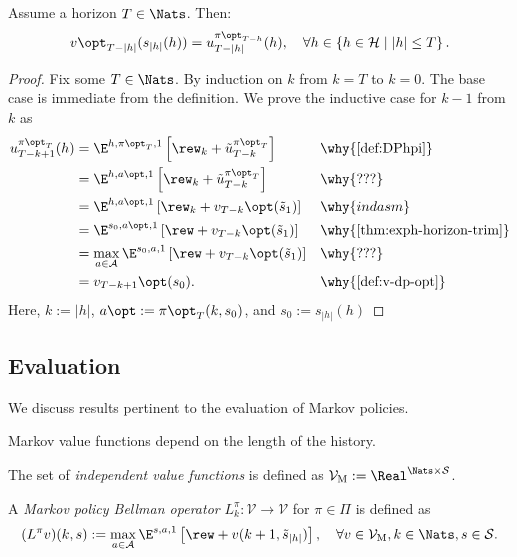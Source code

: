 \begin{theorem}
Assume a horizon $T\in \Nats$. Then:
\[
  v\opt_{T-|h|}(s_{|h|}(h)) = u^{\pi\opt_{T-h}}_{T-|h|}(h), \quad
  \forall h\in \left\{ h\in \mathcal{H} \mid |h| \le T \right\}.
\]
\end{theorem}
\begin{proof}
Fix some $T \in \Nats$. By induction on $k$ from $k = T$ to $k=0$. The base case is immediate from the definition. We prove the inductive case for $k-1$ from $k$ as
\begin{align*}
u^{\pi\opt_T}_{T-k + 1}(h)
  &=  \E^{h, \pi\opt_T, 1} \left[ \rew_k + \tilde{u}^{\pi\opt_T}_{T-k} \right]
  && \why{\cref{def:DPhpi}} \\
  &=  \E^{h, a\opt, 1} \left[ \rew_k + \tilde{u}^{\pi\opt_T}_{T-k} \right]
  && \why{???} \\
  &=  \E^{h, a\opt, 1} \left[ \rew_{k} + v_{T-k}\opt(\tilde{s}_1) \right]
  && \why{ind asm} \\
  &=  \E^{s_0, a\opt, 1} \left[ \rew +  v_{T-k}\opt(\tilde{s}_1) \right]
  && \why{\cref{thm:exph-horizon-trim}} \\
  &=  \max_{a\in \mathcal{A}} \E^{s_0, a, 1} \left[ \rew +  v_{T-k}\opt(\tilde{s}_1) \right]
  && \why{???} \\
  &=  v_{T-k+1}\opt(s_0). && \why{\cref{def:v-dp-opt}}
\end{align*}
Here, $k := |h|$, $a\opt := \pi\opt_T(k, s_0)$, and $s_0 := s_{|h|}(h)$
\end{proof}

\subsection{Evaluation}
We discuss results pertinent to the evaluation of Markov policies. 

Markov value functions depend on the length of the history.
\begin{definition} \label{def:ValuesM}
  The set of \emph{independent value functions} is defined as $\mathcal{V}_{\mathrm{M}} := \Real^{\Nats \times \mathcal{S}}$.
\end{definition}


\begin{definition}\label{def:DPMopt}
A \emph{Markov policy Bellman operator} $L_k^{\pi}\colon \mathcal{V} \to \mathcal{V}$ for $\pi\in \Pi$ is defined as
\[
(L^{\pi} v)(k, s)  :=
\max_{a\in \mathcal{A}} \E^{s, a, 1} \left[ \rew + v(k + 1, \tilde{s}_{|h|}) \right], \quad \forall v\in \mathcal{V}_{\mathrm{M}}, k\in \Nats, s\in \mathcal{S}.
\]
\end{definition}

